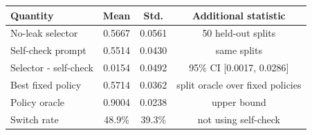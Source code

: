 \begin{tabular}{lccc}
\toprule
Quantity & Mean & Std. & Additional statistic \\
\midrule
No-leak selector & 0.5667 & 0.0561 & 50 held-out splits \\
Self-check prompt & 0.5514 & 0.0430 & same splits \\
Selector - self-check & 0.0154 & 0.0492 & 95\% CI [0.0017, 0.0286] \\
Best fixed policy & 0.5714 & 0.0362 & split oracle over fixed policies \\
Policy oracle & 0.9004 & 0.0238 & upper bound \\
Switch rate & 48.9\% & 39.3\% & not using self-check \\
\bottomrule
\end{tabular}
